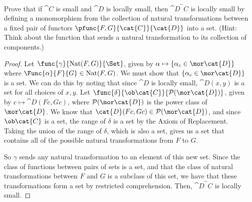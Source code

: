 \documentclass[main.tex]{subfiles}
\begin{document}
\paragraph{}
\begin{exercise}
	Prove that if $\cat{C}$ is small and $\cat{D}$ is locally small, then
	$\cat{D}^\cat{C}$ is locally small by defining a monomorphism from the
	collection of natural transformations between a fixed pair of functors
	$\pfunc{F,G}{\cat{C}}{\cat{D}}$ into a set. (Hint: Think about the function
	that sends a natural transformation to its collection of components.)
\end{exercise}

\begin{proof}
	Let $\func{\gamma}{\text{Nat}(F,G)}{\Set}$, given by
	$\alpha\mapsto\{\alpha_c\in\mor\cat{D}\}$ where
	$\Func{\alpha}{F}{G}\in\text{Nat}(F,G)$. We must show that
	$\{\alpha_c\in\mor\cat{D}\}$ is a set. We can do this by noting that since
	$\cat{D}$ is locally small, $\cat{D}(x,y)$ is a set for all choices of
	$x,y$. Let $\func{\delta}{\ob\cat{C}}{\mathcal{P}(\mor\cat{D})}$, given by
	$c\mapsto\cat{D}(Fc,Gc)$, where $\mathcal{P}(\mor\cat{D})$ is the power
	class of $\mor\cat{D}$. We know that
	$\cat{D}(Fc,Gc)\in\mathcal{P}(\mor\cat{D})$, and since $\ob\cat{C}$ is a
	set, the range of $\delta$ is a set by the Axiom of Replacement. Taking the
	union of the range of $\delta$, which is also a set, gives us a set that
	contains all of the possible natural transformations from $F$ to $G$.

	So $\gamma$ sends any natural transformation to an element of this new set.
	Since the class of functions between pairs of sets is a set, and that the
	class of natural transformations between $F$ and $G$ is a subclass of this
	set, we have that these transformations form a set by restricted
	comprehension. Then, $\cat{D}^\cat{C}$ is locally small.
\end{proof}
\end{document}
